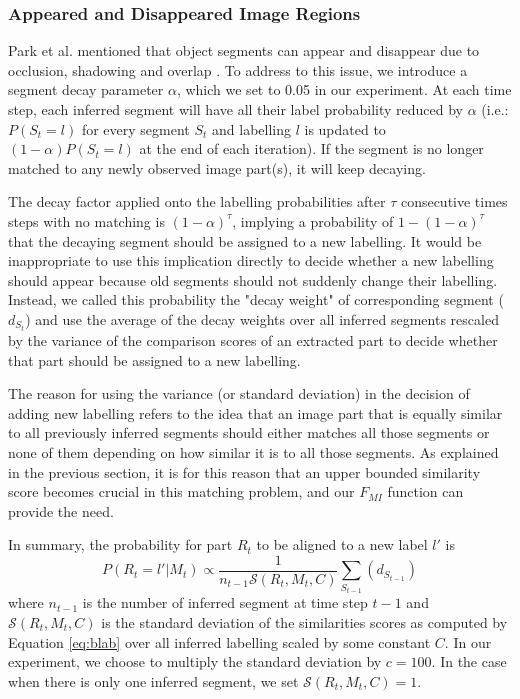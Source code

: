 \documentclass{article}
\begin{document}
\subsubsection{Appeared and Disappeared Image Regions}

Park et al. mentioned that object segments can appear and disappear due to occlusion, shadowing and overlap \cite{human-action}. To address to this issue, we introduce a segment decay parameter $\alpha$, which we set to 0.05 in our experiment. At each time step, each inferred segment will have all their label probability reduced by $\alpha$ (i.e.: $P(S_{t} = l)$ for every segment $S_t$ and labelling $l$ is updated to $(1-\alpha)P(S_{t} = l)$ at the end of each iteration). If the segment is no longer matched to any newly observed image part(s), it will keep decaying. 

The decay factor applied onto the labelling probabilities after $\tau$ consecutive times steps with no matching is $(1-\alpha)^{\tau}$, implying a probability of $1- (1-\alpha)^{\tau}$ that the decaying segment should be assigned to a new labelling. It would be inappropriate to use this implication directly to decide whether a new labelling should appear because old segments should not suddenly change their labelling. Instead, we called this probability the "decay weight" of corresponding segment ($d_{S_t}$) and use the average of the decay weights over all inferred segments rescaled by the variance of the comparison scores of an extracted part to decide whether that part should be assigned to a new labelling. 

The reason for using the variance (or standard deviation) in the decision of adding new labelling refers to the idea that an image part that is equally similar to all previously inferred segments should either matches all those segments or none of them depending on how similar it is to all those segments. As explained in the previous section, it is for this reason that an upper bounded similarity score becomes crucial in this matching problem, and our $F_{MI}$ function can provide the need. 

In summary, the probability for part $R_t$ to be aligned to a new label $l'$ is 
\begin{equation}
	P(R_t = l' | M_t) \propto \frac{1}{n_{t-1}\mathcal{S}(R_t, M_t, C)} \sum_{S_{t-1}}(d_{S_{t-1}})
\end{equation}
where $n_{t-1}$ is the number of inferred segment at time step $t-1$ and $\mathcal{S}(R_t, M_t, C)$ is the standard deviation of the similarities scores as computed by Equation \ref{eq:blab} over all inferred labelling scaled by some constant $C$. In our experiment, we choose to multiply the standard deviation by $c = 100$. In the case when there is only one inferred segment, we set $\mathcal{S}(R_t, M_t, C) = 1$. 
\end{document}
